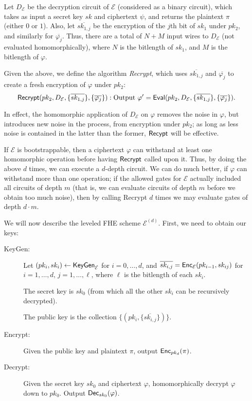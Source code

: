 Let $D_\mathcal{E}$ be the decryption circuit of $\mathcal{E}$ (considered as a binary circuit), which takes as input a secret key $sk$ and ciphertext $\psi$, and returns the plaintext $\pi$ (either $0$ or $1$). Also, let $\overline{sk_{1,j}}$ be the encryption of the $j$th bit of $sk_1$ under $pk_2$, and similarly for $\overline{\varphi_{j}}$. Thus, there are a total of $N + M$ input wires to $D_\mathcal{E}$ (not evaluated homomorphically), where $N$ is the bitlength of $sk_1$, and $M$ is the bitlength of $\varphi$.

Given the above, we define the algorithm \emph{Recrypt}, which uses $\overline{sk_{1,j}}$ and $\overline{\varphi_{j}}$ to create a fresh encryption of $\varphi$ under $pk_2$:
\begin{align*}
{\sf Recrypt}(pk_2, D_\mathcal{E}, \{\overline{sk_{1,j}}\}, \{\overline{\varphi_{j}}\}): \text{Output } \varphi' = {\sf Eval}(pk_2, D_\mathcal{E}, \{\overline{sk_{1,j}}\}, \{\overline{\varphi_{j}}\}).
\end{align*}

In effect, the homomorphic application of $D_\mathcal{E}$ on $\varphi$ removes the noise in $\varphi$, but introduces new noise in the process, from encryption under $pk_2$; as long as less noise is contained in the latter than the former, ${\sf Recypt}$ will be effective.

If $\mathcal{E}$ is bootstrappable, then a ciphertext $\varphi$ can withstand at least one homomorphic operation before having ${\sf Recrypt}$ called upon it. Thus, by doing the above $d$ times, we can execute a $d$-depth circuit. We can do much better, if $\varphi$ can withstand more than one operation; if the allowed gates for $\mathcal{E}$ actually included all circuits of depth $m$ (that is, we can evaluate circuits of depth $m$ before we obtain too much noise), then by calling Recrypt $d$ times we may evaluate gates of depth $d \cdot m$.

We will now describe the leveled FHE scheme $\mathcal{E}^{(d)}$. First, we need to obtain our keys:
\begin{description}
\item[KeyGen:] Let $(pk_i, sk_i) \leftarrow {\sf KeyGen}_\mathcal{E}$ for $i = 0, \dots, d$, and $\overline{sk_{i,j}} = {\sf Enc}_\mathcal{E}(pk_{i-1}, sk_{ij})$ for $i = 1, \dots, d$, $j = 1, \dots, \ell$, where $\ell$ is the bitlength of each $sk_i$.

The secret key is $sk_0$ (from which all the other $sk_i$ can be recursively decrypted).

The public key is the collection $\{(pk_i, \{\overline{sk_{i,j}}\})\}$.

\item[Encrypt:] Given the public key and plaintext $\pi$, output ${\sf Enc}_{pk_d}(\pi)$.

\item[Decrypt:] Given the secret key $sk_0$ and ciphertext $\varphi$, homomorphically decrypt $\varphi$ down to $pk_0$. Output ${\sf Dec}_{sk_0}(\varphi)$.
\end{description}

